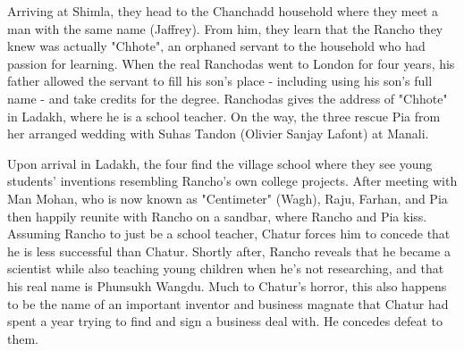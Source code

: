 \documentclass{Article}
\begin{document}
Arriving at Shimla, they head to the Chanchadd household where they meet a man with the same name (Jaffrey). From him, they learn that the Rancho they knew was actually "Chhote", an orphaned servant to the household who had passion for learning. When the real Ranchodas went to London for four years, his father allowed the servant to fill his son's place - including using his son's full name - and take credits for the degree. Ranchodas gives the address of "Chhote" in Ladakh, where he is a school teacher. On the way, the three rescue Pia from her arranged wedding with Suhas Tandon (Olivier Sanjay Lafont) at Manali.

Upon arrival in Ladakh, the four find the village school where they see young students' inventions resembling Rancho's own college projects. After meeting with Man Mohan, who is now known as "Centimeter" (Wagh), Raju, Farhan, and Pia then happily reunite with Rancho on a sandbar, where Rancho and Pia kiss. Assuming Rancho to just be a school teacher, Chatur forces him to concede that he is less successful than Chatur. Shortly after, Rancho reveals that he became a scientist while also teaching young children when he's not researching, and that his real name is Phunsukh Wangdu. Much to Chatur's horror, this also happens to be the name of an important inventor and business magnate that Chatur had spent a year trying to find and sign a business deal with. He concedes defeat to them.
\end{document}
